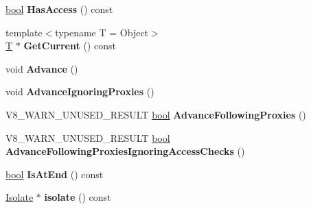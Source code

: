 \begin{DoxyCompactItemize}
\mbox{\hyperlink{classbool}{bool}} {\bfseries Has\+Access} () const
\item 
\mbox{\label{classv8_1_1internal_1_1PrototypeIterator_aff3486f915460efecf211dfb15d1670c}} 
{\footnotesize template$<$typename T  = Object$>$ }\\\mbox{\hyperlink{classv8_1_1internal_1_1torque_1_1T}{T}} $\ast$ {\bfseries Get\+Current} () const
\item 
\mbox{\label{classv8_1_1internal_1_1PrototypeIterator_aac13aff50ca8b7566887d078e4102ff8}} 
void {\bfseries Advance} ()
\item 
\mbox{\label{classv8_1_1internal_1_1PrototypeIterator_ab057cee4da776bc58be4bd5275a00e59}} 
void {\bfseries Advance\+Ignoring\+Proxies} ()
\item 
\mbox{\label{classv8_1_1internal_1_1PrototypeIterator_a05f0904a72f16239b949f447001603ea}} 
V8\+\_\+\+W\+A\+R\+N\+\_\+\+U\+N\+U\+S\+E\+D\+\_\+\+R\+E\+S\+U\+LT \mbox{\hyperlink{classbool}{bool}} {\bfseries Advance\+Following\+Proxies} ()
\item 
\mbox{\label{classv8_1_1internal_1_1PrototypeIterator_adf3d3652db0df44685665f1e708ad513}} 
V8\+\_\+\+W\+A\+R\+N\+\_\+\+U\+N\+U\+S\+E\+D\+\_\+\+R\+E\+S\+U\+LT \mbox{\hyperlink{classbool}{bool}} {\bfseries Advance\+Following\+Proxies\+Ignoring\+Access\+Checks} ()
\item 
\mbox{\label{classv8_1_1internal_1_1PrototypeIterator_abdcad32ac0a91310661b717d396a62f3}} 
\mbox{\hyperlink{classbool}{bool}} {\bfseries Is\+At\+End} () const
\item 
\mbox{\label{classv8_1_1internal_1_1PrototypeIterator_af014263489553d5a99692d9e4e41257c}} 
\mbox{\hyperlink{classv8_1_1internal_1_1Isolate}{Isolate}} $\ast$ {\bfseries isolate} () const
\end{DoxyCompactItemize}

